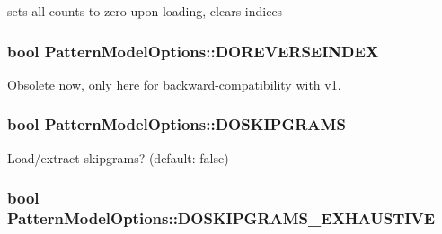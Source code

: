sets all counts to zero upon loading, clears indices 

\hypertarget{classPatternModelOptions_ad4d4b2fa96e3355b9e3f4b8e51bb62ff}{}
\subsubsection[{D\+O\+R\+E\+V\+E\+R\+S\+E\+I\+N\+D\+E\+X}]{\setlength{\rightskip}{0pt plus 5cm}bool Pattern\+Model\+Options\+::\+D\+O\+R\+E\+V\+E\+R\+S\+E\+I\+N\+D\+E\+X}\label{classPatternModelOptions_ad4d4b2fa96e3355b9e3f4b8e51bb62ff}


Obsolete now, only here for backward-\/compatibility with v1. 

\hypertarget{classPatternModelOptions_a79465fd9abbfab5a481222d9660e598a}{}
\subsubsection[{D\+O\+S\+K\+I\+P\+G\+R\+A\+M\+S}]{\setlength{\rightskip}{0pt plus 5cm}bool Pattern\+Model\+Options\+::\+D\+O\+S\+K\+I\+P\+G\+R\+A\+M\+S}\label{classPatternModelOptions_a79465fd9abbfab5a481222d9660e598a}


Load/extract skipgrams? (default\+: false) 

\hypertarget{classPatternModelOptions_ab9f8da4d9fe653cf967f571ae6766ed4}{}
\subsubsection[{D\+O\+S\+K\+I\+P\+G\+R\+A\+M\+S\+\_\+\+E\+X\+H\+A\+U\+S\+T\+I\+V\+E}]{\setlength{\rightskip}{0pt plus 5cm}bool Pattern\+Model\+Options\+::\+D\+O\+S\+K\+I\+P\+G\+R\+A\+M\+S\+\_\+\+E\+X\+H\+A\+U\+S\+T\+I\+V\+E}\label{classPatternModelOptions_ab9f8da4d9fe653cf967f571ae6766ed4}


